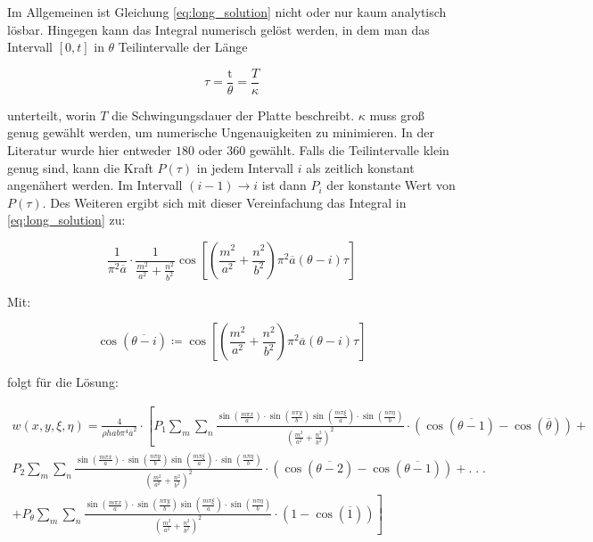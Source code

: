 Im Allgemeinen ist Gleichung \ref{eq:long_solution} nicht oder nur kaum analytisch lösbar. Hingegen kann das Integral numerisch gelöst werden, in dem man das Intervall $\left[ 0,t \right]$ in $\theta$ Teilintervalle der Länge

 \begin{equation}
 	\tau = \dfrac{\mbox{t}}{\theta}=\dfrac{T}{\kappa}
 \end{equation}
 
 unterteilt, worin $T$ die Schwingungsdauer der Platte beschreibt. $\kappa$ muss groß genug gewählt werden, um numerische Ungenauigkeiten zu minimieren. In der Literatur wurde hier entweder $180$ oder $360$ gewählt. Falls die Teilintervalle klein genug sind, kann die Kraft $P(\tau	)$ in jedem Intervall $i$ als zeitlich konstant angenähert werden. Im Intervall $(i-1) \rightarrow i$ ist dann $P_{i}$ der konstante Wert von $P(\tau)$. Des Weiteren ergibt sich mit dieser Vereinfachung das Integral in \ref{eq:long_solution} zu:
 
 \begin{equation}
 	\frac{1}{\pi^2\overline{a}} \cdot \frac{1}{\frac{m^2}{a^2}+\frac{n^2}{b^2}} \cos \left[ \left( \frac{m^2}{a^2}+\frac{n^2}{b^2} \right) \pi^2\overline{a}(\theta - i)\tau\right]
 \end{equation}  
 
Mit:

$$\cos\left(\overline{\theta - i}\right) \coloneqq \cos \left[ \left( \frac{m^2}{a^2}+\frac{n^2}{b^2} \right) \pi^2\overline{a}(\theta - i)\tau\right] $$

\newpage

folgt für die Lösung:

\begin{equation}
\begin{multlined}
	w(x,y,\xi, \eta) = \frac{4}{\rho h a b \pi^4 \overline{a}^2} \cdot \left[ P_{1} \sum_m \sum_n \frac{\sin\left(\frac{m \pi x}{a}\right) \cdot \sin\left(\frac{n \pi y}{b}\right) \sin\left(\frac{m \pi \xi}{a}\right) \cdot \sin\left(\frac{n \pi \eta}{b}\right)	}{ \left( \frac{m^2}{a^2} + \frac{n^2}{b^2} \right)^2} \cdot \left( \cos(\overline{\theta-1}) - \cos(\overline{\theta}) \right) + \right. \\ P_{2} \sum_m \sum_n \frac{\sin\left(\frac{m \pi x}{a}\right) \cdot \sin\left(\frac{n \pi y}{b}\right) \sin\left(\frac{m \pi \xi}{a}\right) \cdot \sin\left(\frac{n \pi \eta}{b}\right)	}{ \left( \frac{m^2}{a^2} + \frac{n^2}{b^2} \right)^2} \cdot \left( \cos(\overline{\theta-2}) - \cos(\overline{\theta-1}) \right) + . \; . \; .\ \\ \left. + P_{\theta} \sum_m \sum_n \frac{\sin\left(\frac{m \pi x}{a}\right) \cdot \sin\left(\frac{n \pi y}{b}\right) \sin\left(\frac{m \pi \xi}{a}\right) \cdot \sin\left(\frac{n \pi \eta}{b}\right)	}{ \left( \frac{m^2}{a^2} + \frac{n^2}{b^2} \right)^2} \cdot \left( 1 - \cos(\overline{1}) \right) \right]
	\label{eq:horror}
\end{multlined}
\end{equation}


